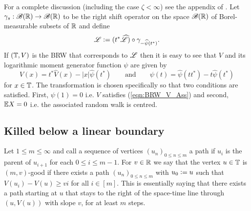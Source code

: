 

For a complete discussion (including the case $\zeta < \infty$) see the appendix of \cite{jaffuel2227critical}. Let $\gamma_s : \mathscr{B}(\mathbb{R}) \to \mathscr{B}(\mathbb{R})$ to be the right shift operator on the space $\mathscr{B}(\mathbb{R})$ of Borel-measurable subsets of $\mathbb{R}$ and define
\begin{equation}\label{eqn:transformation}
\mathscr{L} \vcentcolon= (t^* \widehat{\mathscr{L}}) \circ \gamma_{- \widehat{\psi}(t^*)}. 
\end{equation}
If $(\mathbb{T}, V)$ is the BRW that corresponds to $\mathscr{L}$ then it is easy to see that $V$ and its logarithmic moment generator function $\psi$ are given by 
\begin{equation}\label{eqn:transformation2}
V(x) = t^* \widehat{V}(x) - |x| \widehat{\psi}(t^*) \qquad\text{and}\qquad \psi(t) = \widehat{\psi}(t t^*) -t \widehat{\psi}(t^*) 
\end{equation}
for $x \in \mathbb{T}$. The transformation is chosen specifically so that two conditions are satisfied. First, $\psi(1) = 0$ i.e. $V$ satisfies (\ref{eqn:BRW_V_Ass}) and second, $\mathbb{E} X = 0$ i.e. the associated random walk is centred.






\subsection{Killed below a linear boundary}

Let $1 \leq m \leq \infty$ and call a sequence of vertices $(u_n)_{0 \leq n \leq m}$ a path if $u_i$ is the parent of $u_{i+1}$ for each $0 \leq i \leq m-1$. For $v \in \mathbb{R}$ we say that the vertex $u \in \mathbb{T}$ is $(m, v)$-good if there exists a path $(u_n)_{0 \leq n \leq m}$ with $u_0 \vcentcolon= u$ such that $V(u_i) - V(u) \geq vi$ for all $i \in [m]$. This is essentially saying that there exists a path starting at $u$ that stays to the right of the space-time line through $(u, V(u))$ with slope $v$, for at least $m$ steps. \\

